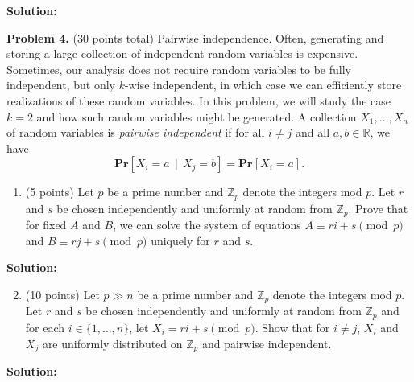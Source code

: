 \documentclass[11pt]{article}
\newcommand{\PPr}[1]{\ensuremath{\mathbf{Pr}\left[#1\right]}}
\begin{document}
\noindent\textbf{Solution:}






\newpage\noindent
\textbf{Problem 4.} (30 points total)
Pairwise independence.
\vskip 0.1in\noindent
Often, generating and storing a large collection of independent random variables is expensive. Sometimes, our analysis does not require random variables to be fully independent, but only $k$-wise independent, in which case we can efficiently store realizations of these random variables. In this problem, we will study the case $k=2$ and how such random variables might be generated.
\vskip 0.1in\noindent
A collection $X_1,\ldots,X_n$ of random variables is \emph{pairwise independent} if for all $i\neq j$ and all $a,b\in\mathbb{R}$, we have
\[\PPr{X_i=a\,\mid\,X_j=b}=\PPr{X_i=a}.\]
\begin{enumerate}
\item (5 points)
Let $p$ be a prime number and $\mathbb{Z}_p$ denote the integers mod $p$. 
Let $r$ and $s$ be chosen independently and uniformly at random from $\mathbb{Z}_p$.  
Prove that for fixed $A$ and $B$, we can solve the system of equations $A\equiv ri+s\pmod{p}$ and $B\equiv rj+s\pmod{p}$ uniquely for $r$ and $s$. 
\end{enumerate}

\noindent\textbf{Solution:}












\begin{enumerate}
\setcounter{enumi}{1}
\item (10 points)
Let $p\gg n$ be a prime number and $\mathbb{Z}_p$ denote the integers mod $p$. 
Let $r$ and $s$ be chosen independently and uniformly at random from $\mathbb{Z}_p$ and for each $i\in\{1,\ldots,n\}$, let $X_i=ri+s\pmod{p}$. 
Show that for $i\neq j$, $X_i$ and $X_j$ are uniformly distributed on $\mathbb{Z}_p$ and pairwise independent. 
\end{enumerate}

\noindent\textbf{Solution:}
\end{document}

